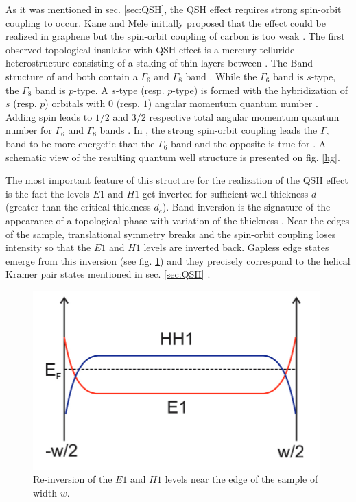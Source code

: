 

As it was mentioned in sec. \ref{sec:QSH}, the QSH effect requires strong spin-orbit coupling to occur. Kane and Mele initially proposed that the effect could be realized in graphene but the spin-orbit coupling of carbon is too weak \cite{cayssol_topological_2021}. The first observed topological insulator with QSH effect is a mercury telluride heterostructure consisting of a staking of thin  layers between  \cite{kane_this_2011}. The Band structure of  and  both contain a $\Gamma_6$ and $\Gamma_8$ band \cite{bernevig_topological_2013}. While the $\Gamma_6$ band is $s$-type, the $\Gamma_8$ band is $p$-type. A $s$-type (resp. $p$-type) is formed with the hybridization of $s$ (resp. $p$) orbitals with $0$ (resp. $1$) angular momentum quantum number \cite{girvin_modern_2019}. Adding spin leads to $1/2$ and $3/2$ respective total angular momentum quantum number for $\Gamma_6$ and $\Gamma_8$ bands \cite{bernevig_topological_2013}. In , the strong spin-orbit coupling leads the $\Gamma_8$ band to be more energetic than the $\Gamma_6$ band and the opposite is true for  \cite{buhmann_quantum_2011}. A schematic view of the resulting quantum well structure is presented on fig. \ref{hg}.


The most important feature of this structure for the realization of the QSH effect is the fact the levels $E1$ and $H1$ get inverted for sufficient well thickness $d$ (greater than the critical thickness $d_c$). Band inversion is the signature of the appearance of a topological phase with variation of the thickness \cite{bansil_colloquium_2016}. Near the edges of the sample, translational symmetry breaks and the spin-orbit coupling loses intensity so that the $E1$ and $H1$ levels are inverted back. Gapless edge states emerge from this inversion (see fig. \ref{cross}) and they precisely correspond to the helical Kramer pair states mentioned in sec. \ref{sec:QSH} \cite{buhmann_quantum_2011}.  

\begin{figure}
    \includegraphics[width=\columnwidth]{sections/visuel/cross}
    \centering
    \caption{Re-inversion of the $E1$ and $H1$ levels near the edge of the sample of width $w$.}
    \label{cross}
\end{figure}